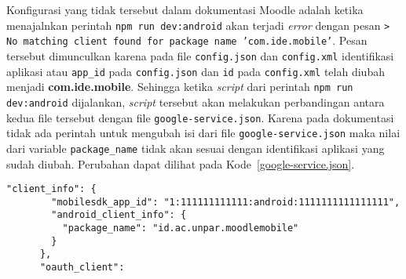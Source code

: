 Konfigurasi yang tidak tersebut dalam dokumentasi Moodle adalah ketika menajalnkan perintah \texttt{npm run dev:android} akan terjadi \textit{error} dengan pesan \texttt{> No matching client found for package name 'com.ide.mobile'}. Pesan tersebut dimunculkan karena pada file \texttt{config.json} dan \texttt{config.xml} identifikasi aplikasi atau \texttt{app\_id} pada \texttt{config.json} dan \texttt{id} pada \texttt{config.xml} telah diubah menjadi \textbf{com.ide.mobile}. Sehingga ketika \textit{script} dari perintah \texttt{npm run dev:android} dijalankan, \textit{script} tersebut akan melakukan perbandingan antara kedua file tersebut dengan file \texttt{google-service.json}. Karena pada dokumentasi tidak ada perintah untuk mengubah isi dari file \texttt{google-service.json} maka nilai dari variable \texttt{package\_name} tidak akan sesuai dengan identifikasi aplikasi yang sudah diubah. Perubahan dapat dilihat pada \mbox{Kode \ref{google-service.json}}. 

\vspace{1cm}

\begin{lstlisting}[frame=single, label ={google-service.json}, caption = Menyesuaikan \texttt{package\_name} dengan \texttt{app\_id} pada \texttt{google-service.json} ]
      "client_info": {
        "mobilesdk_app_id": "1:111111111111:android:1111111111111111",
        "android_client_info": {
          "package_name": "id.ac.unpar.moodlemobile"
        }
      },
      "oauth_client": 
\end{lstlisting}
